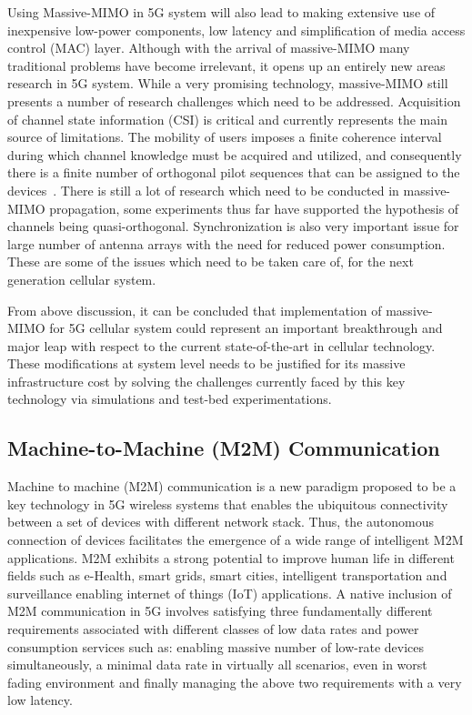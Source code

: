 Using Massive-MIMO in 5G system will also lead to making extensive use of inexpensive low-power components, low latency and simplification of media access control (MAC) layer. Although with the arrival of massive-MIMO many traditional problems have become irrelevant, it opens up an entirely new areas research in 5G system. While a very promising technology, massive-MIMO still presents a number of research challenges which need to be addressed. Acquisition of channel state information (CSI) is critical and currently represents the main source of limitations. The mobility of users imposes a finite coherence interval during which channel knowledge must be acquired and utilized, and consequently there is a finite number of orthogonal pilot sequences that can be assigned to the devices~\cite{Boccardi2014}. There is still a lot of research which need to be conducted in massive-MIMO propagation, some experiments thus far have supported the hypothesis of channels being quasi-orthogonal. Synchronization is also very important issue for large number of antenna arrays with the need for reduced power consumption. These are some of the issues which need to be taken care of, for the next generation cellular system.

From above discussion, it can be concluded that implementation of massive-MIMO for 5G cellular system could represent an important breakthrough and major leap with respect to the current state-of-the-art in cellular technology. These modifications at system level needs to be justified for its massive infrastructure cost by solving the challenges currently faced by this key technology via simulations and test-bed experimentations.

\subsection{Machine-to-Machine (M2M) Communication}

Machine to machine (M2M) communication is a new paradigm proposed to be a key technology in 5G wireless systems that enables the ubiquitous connectivity  between a set  of devices  with different network stack.  Thus,  the  autonomous  connection  of  devices  facilitates  the  emergence  of  a  wide  range  of  intelligent M2M applications. M2M exhibits a strong potential to improve human life in different fields such as e-Health, smart  grids, smart cities, intelligent transportation and surveillance enabling internet of things (IoT) applications. A native inclusion of M2M communication in 5G involves satisfying three fundamentally different requirements associated with different classes of low data rates and power consumption services such as: enabling massive number of low-rate devices simultaneously, a minimal data rate in virtually all scenarios, even in worst fading environment and finally managing the above two requirements with a very low latency.


